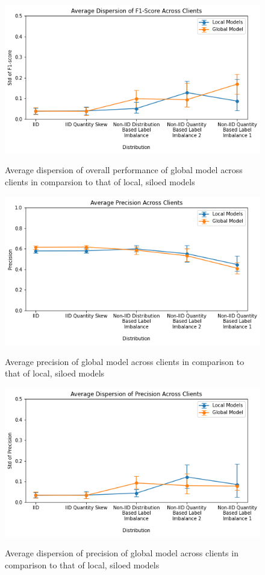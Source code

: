 \documentclass[letterpaper]{article} %
\begin{document}
\begin{figure}[h]
{\includegraphics[width=\columnwidth]{Avg_dispersion_of_f1_score_of_local_models_against_that_of_global_model}}
\caption{Average dispersion of overall performance of global model across clients in comparsion to that of local, siloed models}
\end{figure}

\begin{figure}[hbt!]
{\includegraphics[width=\columnwidth]{Avg_precision_of_local_models_against_that_of_global_model}}
\caption{Average precision of global model across clients in comparison to that of local, siloed models}
\end{figure}

\begin{figure}[hbt!]
{\includegraphics[width=\columnwidth]{Avg_dispersion_of_precision_of_local_models_against_that_of_global_model}}
\caption{Average dispersion of precision of global model across clients in comparison to that of local, siloed models}
\end{figure}
\end{document}
